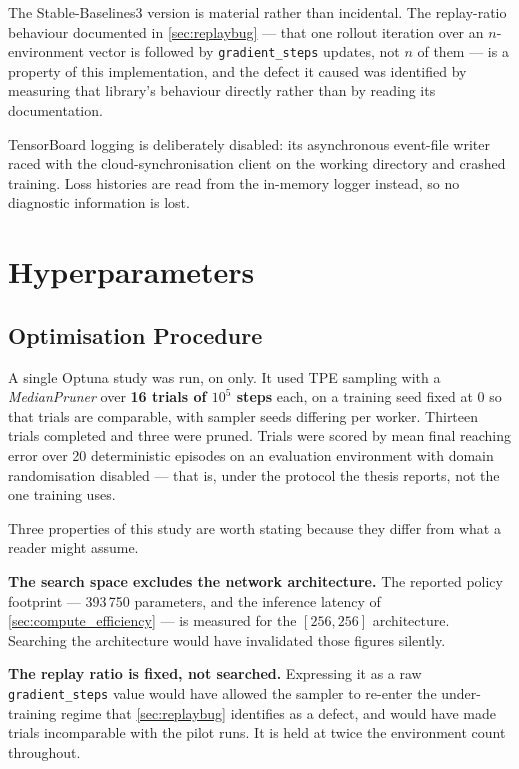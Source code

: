The Stable-Baselines3 version is material rather than incidental. The replay-ratio
behaviour documented in \cref{sec:replaybug} --- that one rollout iteration over
an $n$-environment vector is followed by \texttt{gradient\_steps} updates, not
$n$ of them --- is a property of this implementation, and the defect it caused was
identified by measuring that library's behaviour directly rather than by reading
its documentation.

TensorBoard logging is deliberately disabled: its asynchronous event-file writer
raced with the cloud-synchronisation client on the working directory and crashed
training. Loss histories are read from the in-memory logger instead, so no
diagnostic information is lost.

\section{Hyperparameters}

\subsection{Optimisation Procedure}

A single Optuna study was run, on \SAC only. It used TPE sampling with a
\textit{MedianPruner} over \textbf{16 trials of $10^5$ steps} each, on a training
seed fixed at 0 so that trials are comparable, with sampler seeds differing per
worker. Thirteen trials completed and three were pruned. Trials were scored by
mean final reaching error over 20 deterministic episodes on an evaluation
environment with domain randomisation disabled --- that is, under the protocol the
thesis reports, not the one training uses.

Three properties of this study are worth stating because they differ from what a
reader might assume.

\textbf{The search space excludes the network architecture.} The reported policy
footprint --- 393\,750 parameters, and the inference latency of
\cref{sec:compute_efficiency} --- is measured for the $[256, 256]$ architecture.
Searching the architecture would have invalidated those figures silently.

\textbf{The replay ratio is fixed, not searched.} Expressing it as a raw
\texttt{gradient\_steps} value would have allowed the sampler to re-enter the
under-training regime that \cref{sec:replaybug} identifies as a defect, and would
have made trials incomparable with the pilot runs. It is held at twice the
environment count throughout.

